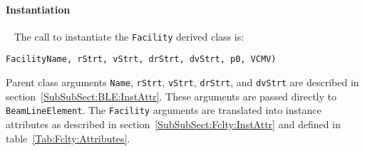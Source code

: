 \paragraph{Instantiation} ~\newline
\noindent
The call to instantiate the \texttt{Facility} derived class is:
\begin{center}
  \texttt{FacilityName, rStrt, vStrt, drStrt, dvStrt, p0, VCMV)}
\end{center}
Parent class arguments \texttt{Name}, \texttt{rStrt}, \texttt{vStrt},
\texttt{drStrt}, and \texttt{dvStrt} are described in
section~\ref{SubSubSect:BLE:InstAttr}.
These arguments are passed directly to \texttt{BeamLineElement}.
The \texttt{Facility} arguments are translated into instance
attributes as described in section~\ref{SubSubSect:Fclty:InstAttr} and
defined in table~\ref{Tab:Fclty:Attributes}.

